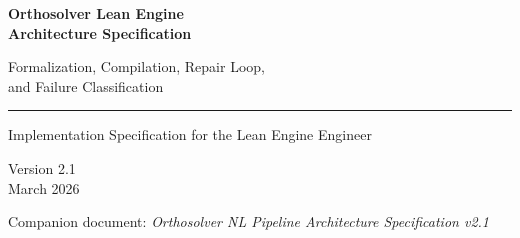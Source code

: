 \documentclass[11pt,a4paper]{article}
\newcommand{\Lean}{\textsc{Lean}}
\newcommand{\Claude}{Claude}
\begin{document}
\begin{titlepage}
\centering
\vspace*{1.6cm}

{\Huge\bfseries\color{deepblue} Orthosolver Lean Engine \\[0.3cm] Architecture Specification}

\vspace{0.8cm}

{\Large\color{midblue} Formalization, Compilation, Repair Loop, \\[0.15cm] and Failure Classification}

\vspace{0.7cm}
\rule{0.75\textwidth}{1pt}

\vspace{1.0cm}

{\large Implementation Specification for the Lean Engine Engineer}

\vspace{0.4cm}

{\normalsize Version 2.1 \\ March 2026}

\vspace{1.5cm}

\begin{abstract}
\noindent This document specifies the complete architecture of the Orthosolver \Lean{} engine: the four operating modes (assembly check, lemma formalization, root assembly, statement plausibility check), the internal \Claude{} formalization agent (Agent~6), the statement plausibility checker (Agent~7), the hybrid stateful/stateless repair loop, the error classification taxonomy, the Docker environment with pre-compiled Mathlib, and the HTTP API contract the engine must implement. This document also describes what the NL pipeline sends to the engine and how it uses results, so the engine engineer has full context. It does \textbf{not} specify the NL agents (1--5), the controller routing logic, or the database schema. Those are in the companion document: \textit{Orthosolver NL Pipeline Architecture Specification}.
\end{abstract}

\vfill

{\small Companion document: \textit{Orthosolver NL Pipeline Architecture Specification v2.1}}
\end{titlepage}

\tableofcontents
\newpage

\end{document}
